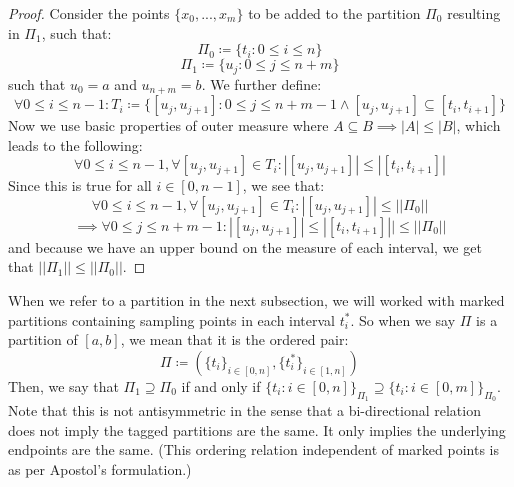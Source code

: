 \documentclass[10pt,letterpaper]{article} %
\begin{document}
\begin{proof}
Consider the points $\{x_0, ..., x_m\}$ to be added to the partition $\Pi_0$ resulting in $\Pi_1$, such that:
\begin{equation*}
\Pi_0 \coloneq \{t_i: 0 \leqslant i \leqslant n\}
\end{equation*}
\begin{equation*}
\Pi_1 \coloneq \{u_j : 0 \leqslant j \leqslant n+m\}
\end{equation*}
such that $u_0 = a$ and $u_{n+m} = b$. We further define:
\begin{equation*}
\forall 0 \leqslant i \leqslant n-1: T_i \coloneq \{[u_j, u_{j+1}] : 0 \leqslant j \leqslant n+m - 1 \land [u_j, u_{j+1}] \subseteq [t_i, t_{i+1}]\}   
\end{equation*}
Now we use basic properties of outer measure where $A \subseteq B \implies |A| \leqslant |B|$, which leads to the following:
\begin{equation*}
\forall 0 \leqslant i \leqslant n-1, \forall [u_j, u_{j+1}] \in T_i: |[u_j, u_{j+1}]| \leqslant |[t_i, t_{i+1}]|
\end{equation*}
Since this is true for all $i \in [0, n-1]$, we see that:
\begin{equation*}
\forall 0 \leqslant i \leqslant n-1, \forall [u_j, u_{j+1}] \in T_i: |[u_j, u_{j+1}]| \leqslant ||\Pi_0||
\end{equation*}
\begin{equation*}
\implies \forall 0 \leqslant j \leqslant n+m-1: |[u_j, u_{j+1}]| \leqslant |[t_i, t_{i+1}]|| \leqslant ||\Pi_0||
\end{equation*}
and because we have an upper bound on the measure of each interval, we get that $||\Pi_1|| \leqslant ||\Pi_0||$. 
\end{proof}
When we refer to a partition in the next subsection, we will worked with marked partitions containing sampling points in each interval $t_i^*$. So when we say $\Pi$ is a partition of $[a, b]$, we mean that it is the ordered pair:
\begin{equation*}
\Pi \coloneq (\{t_i\}_{i \in [0, n]}, \{t_i^*\}_{i \in [1, n]})
\end{equation*}
Then, we say that $\Pi_1 \supseteq \Pi_0$ if and only if $\{t_i: i \in [0, n]\}_{\Pi_1} \supseteq \{t_i : i \in [0, m]\}_{\Pi_0}$. Note that this is not antisymmetric in the sense that a bi-directional relation does not imply the tagged partitions are the same. It only implies the underlying endpoints are the same. (This ordering relation independent of marked points is as per Apostol's formulation.)\\
\end{document}
